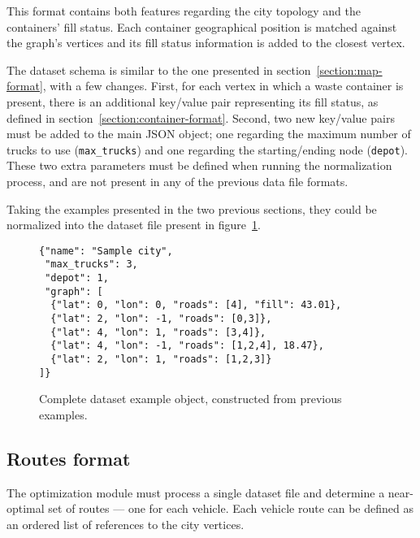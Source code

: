 This format contains both features regarding the city topology and the
containers' fill status. Each container geographical position is matched
against the graph's vertices and its fill status information is added to the
closest vertex.

The dataset schema is similar to the one presented in
section~\ref{section:map-format}, with a few changes. First, for each vertex in
which a waste container is present, there is an additional key/value pair
representing its fill status, as defined in
section~\ref{section:container-format}. Second, two new key/value pairs must be
added to the main JSON object; one regarding the maximum number of trucks to
use (\texttt{max\_trucks}) and one regarding the starting/ending node
(\texttt{depot}). These two extra parameters must be defined when running the normalization process,
and are not present in any of the previous data file formats.

Taking the examples presented in the two previous sections, they could be
normalized into the dataset file present in figure~\ref{fig:dataset-example}.

\begin{figure}[th]
  \begin{center}
    \leavevmode
      \begin{minipage}{12cm}
    \begin{verbatim}
{"name": "Sample city",
 "max_trucks": 3,
 "depot": 1,
 "graph": [
  {"lat": 0, "lon": 0, "roads": [4], "fill": 43.01},
  {"lat": 2, "lon": -1, "roads": [0,3]},
  {"lat": 4, "lon": 1, "roads": [3,4]},
  {"lat": 4, "lon": -1, "roads": [1,2,4], 18.47},
  {"lat": 2, "lon": 1, "roads": [1,2,3]}
]}
    \end{verbatim}
    \end{minipage}
    \caption{Complete dataset example object, constructed from previous examples.}
    \label{fig:dataset-example}
  \end{center}
\end{figure}





\subsection{Routes format}
\label{section:routes-format}

The optimization module must process a single dataset file and determine a
near-optimal set of routes --- one for each vehicle. Each vehicle route can be
defined as an ordered list of references to the city vertices.

